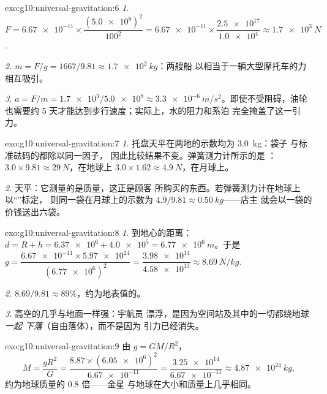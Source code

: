 \begin{solution}{exo:g10:universal-gravitation:6}
\emph{1.} $F = \num{6.67e-11} \times
\dfrac{(\num{5.0e8})^2}{100^2}
= \num{6.67e-11} \times \dfrac{\num{2.5e17}}{\num{1.0e4}}
\approx \qty{1.7e3}{N}$.

\emph{2.} $m = F/g = 1667/9.81 \approx \qty{1.7e2}{kg}$：两艘船
以相当于一辆大型摩托车的力相互吸引。

\emph{3.} $a = F/m = \num{1.7e3}/\num{5.0e8} \approx
\qty{3.3e-6}{m/s^2}$。即使不受阻碍，油轮也需要约
5 天才能达到步行速度；实际上，水的阻力和系泊
完全掩盖了这一引力。
\end{solution}

\begin{solution}{exo:g10:universal-gravitation:7}
\emph{1.} 托盘天平在两地的示数均为 \qty{3.0}{kg}：袋子
与标准砝码的都除以同一因子，
因此比较结果不变。弹簧测力计所示的是
：$3.0 \times 9.81 \approx \qty{29}{N}$，在地球上
$3.0 \times 1.62 \approx \qty{4.9}{N}$，在月球上。

\emph{2.} 天平：它测量的是质量，这正是顾客
所购买的东西。若弹簧测力计在地球上以“”标定，
则同一袋在月球上的示数为 $4.9/9.81 \approx \qty{0.50}{kg}$——店主
就会以一袋的价钱送出六袋。
\end{solution}

\begin{solution}{exo:g10:universal-gravitation:8}
\emph{1.} 到地心的距离：
$d = R + h = \num{6.37e6} + \num{4.0e5} = \qty{6.77e6}{m}$。于是
$g = \dfrac{\num{6.67e-11} \times \num{5.97e24}}{(\num{6.77e6})^2}
= \dfrac{\num{3.98e14}}{\num{4.58e13}} \approx \qty{8.69}{N/kg}$.

\emph{2.} $8.69/9.81 \approx 89\%$，约为地表值的。

\emph{3.} 高空的几乎与地面一样强：宇航员
漂浮，是因为空间站及其中的一切都绕地球\emph{一起
下落}（自由落体），而不是因为
引力已经消失。
\end{solution}

\begin{solution}{exo:g10:universal-gravitation:9}
由 $g = GM/R^2$，
\[
M = \frac{g R^2}{G}
= \frac{8.87 \times (\num{6.05e6})^2}{\num{6.67e-11}}
= \frac{\num{3.25e14}}{\num{6.67e-11}}
\approx \qty{4.87e24}{kg},
\]
约为地球质量的 $0.8$ 倍——金星
与地球在大小和质量上几乎相同。
\end{solution}

